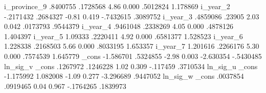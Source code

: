     i_province_9 {\VBAR}   .8400755   .1728568     4.86   0.000     .5012824    1.178869
        i_year_2 {\VBAR}  -.2171432   .2684327    -0.81   0.419    -.7432615    .3089752
        i_year_3 {\VBAR}   .4859086     .23905     2.03   0.042     .0173793    .9544379
        i_year_4 {\VBAR}   .9461048   .2338269     4.05   0.000     .4878126    1.404397
        i_year_5 {\VBAR}    1.09333   .2220411     4.92   0.000     .6581377    1.528523
        i_year_6 {\VBAR}   1.228338   .2168503     5.66   0.000     .8033195    1.653357
        i_year_7 {\VBAR}   1.201616   .2266176     5.30   0.000     .7574539    1.645779
           _cons {\VBAR}  -1.586701   .5324855    -2.98   0.003    -2.630354   -.5430485
ln_sig_v         {\VBAR}
           _cons {\VBAR}   .1267972   .1246228     1.02   0.309     -.117459    .3710534
ln_sig_u         {\VBAR}
           _cons {\VBAR}  -1.175992   1.082008    -1.09   0.277    -3.296689    .9447052
ln_sig_w         {\VBAR}
           _cons {\VBAR}   .0037854   .0919465     0.04   0.967    -.1764265    .1839973
